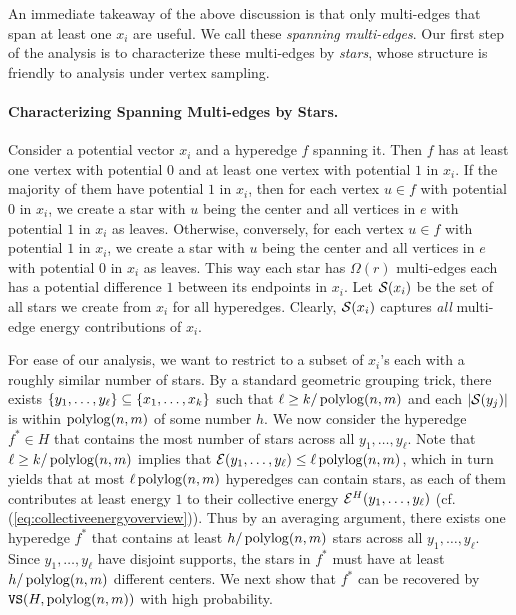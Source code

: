 \documentclass{article}
\begin{document}
An immediate takeaway of the above discussion is that
only multi-edges that span at least one $x_i$ are useful.
We call these \textit{spanning multi-edges}.
Our first step of the analysis is to characterize these multi-edges by \textit{stars},
whose structure is friendly to analysis under vertex sampling.

\paragraph{Characterizing Spanning Multi-edges by Stars.}
Consider a potential vector $x_i$ and a hyperedge $f$ spanning it.
Then $f$ has at least one vertex with potential $0$ and at least one vertex with
potential $1$ in $x_i$. If the majority of them have potential $1$ in $x_i$,
then for each vertex $u\in f$ with potential $0$ in $x_i$,
we create a star with $u$ being the center
and all vertices in $e$ with potential $1$ in $x_i$ as leaves.
Otherwise, conversely, for each vertex $u\in f$ with potential $1$ in $x_i$,
we create a star with $u$ being the center
and all vertices in $e$ with potential $0$ in $x_i$ as leaves.
This way each star has $\Omega(r)$ multi-edges each has a potential difference
$1$ between its endpoints in $x_i$.
Let $\mathcal{S}(x_i)$ be the set of all stars we create from $x_i$ for all hyperedges.
Clearly, $\mathcal{S}(x_i)$ captures \textit{all} multi-edge energy contributions of $x_i$.

For ease of our analysis, we want to restrict
to a subset of $x_i$'s each with a roughly similar number of stars.
By a standard geometric grouping trick,
there exists $\left\{y_1,\ldots,y_{\ell} \right\}\subseteq \left\{x_1,\ldots,x_k \right\}$
such that $\ell \geq k/\operatorname{polylog}(n,m)$ and each $\left|\mathcal{S}(y_j) \right|$ is
within $\operatorname{polylog}(n,m)$ of some number $h$.
We now consider the hyperedge $f^*\in H$ that contains the most number of stars
across all $y_1,\ldots,y_{\ell}$.
Note that $\ell \geq k/\operatorname{polylog}(n,m)$ implies that
$\mathcal{E}(y_1,\ldots,y_{\ell}) \leq \ell \operatorname{polylog}(n,m)$,
which in turn yields that at most $\ell \operatorname{polylog}(n,m)$ hyperedges can contain stars,
as each of them contributes at least energy $1$ to their collective energy
$\mathcal{E}^H(y_1,\ldots,y_{\ell})$ (cf. (\ref{eq:collectiveenergyoverview})).
Thus by an averaging argument, there exists one hyperedge $f^*$ that
contains at least $h/\operatorname{polylog}(n,m)$ stars across all $y_1,\ldots,y_{\ell}$.
Since $y_1,\ldots,y_{\ell}$ have disjoint supports,
the stars in $f^*$ must have at least $h/\operatorname{polylog}(n,m)$ different centers.
We next show that $f^*$ can be recovered by $\mathtt{VS}(H, \operatorname{polylog}(n,m))$ with high probability.
\end{document}

